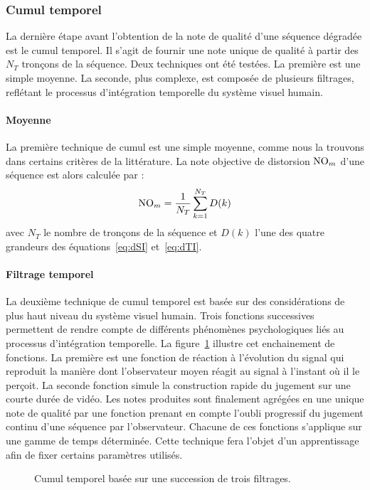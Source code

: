 \subsubsection{Cumul temporel}
La dernière étape avant l'obtention de la note de qualité d'une séquence dégradée est le cumul temporel. Il s'agit de fournir une note unique de qualité à partir des $N_T$ tronçons de la séquence. Deux techniques ont été testées. La première est une simple moyenne. La seconde, plus complexe, est composée de plusieurs filtrages, reflétant le processus d'intégration temporelle du système visuel humain.


\paragraph{Moyenne}
La première technique de cumul est une simple moyenne, comme nous la trouvons dans certains critères de la littérature. La note objective de distorsion $\NO_m$ d'une séquence est alors calculée par :
\begin{equation}
\NO_{m} = \frac{1}{N_T} \sum_{k=1}^{N_T} D(k)
\end{equation}
%
avec $N_T$ le nombre de tronçons de la séquence et $D(k)$ l'une des quatre grandeurs des équations~\ref{eq:dSI} et~\ref{eq:dTI}.


\paragraph{Filtrage temporel}
La deuxième technique de cumul temporel est basée sur des considérations de plus haut niveau du système visuel humain. Trois fonctions successives permettent de rendre compte de différents phénomènes psychologiques liés au processus d'intégration temporelle. La figure~\ref{fig:schemaFiltrageTemporel} illustre cet enchainement de fonctions. La première est une fonction de réaction à l'évolution du signal qui reproduit la manière dont l'observateur moyen réagit au signal à l'instant où il le perçoit. La seconde fonction simule la construction rapide du jugement sur une courte durée de vidéo. Les notes produites sont finalement agrégées en une unique note de qualité par une fonction prenant en compte l'oubli progressif du jugement continu d'une séquence par l'observateur. Chacune de ces fonctions s'applique sur une gamme de temps déterminée. Cette technique fera l'objet d'un apprentissage afin de fixer certains paramètres utilisés.

\begin{figure}[htbp]
	\centering
	\begin{tikzpicture}[node distance = 2cm, auto, text width=2cm, text centered]
	
	\end{tikzpicture}
	\caption{Cumul temporel basée sur une succession de trois filtrages.}
  \label{fig:schemaFiltrageTemporel}
\end{figure}


